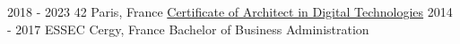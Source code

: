 \documentclass[10pt]{developercv} %
\begin{document}


\begin{entrylist}
	\entry
		{2018 - 2023}
		{42}
		{Paris, France}
		{\href{https://cv.42.fr/abarthel}{Certificate of Architect in Digital Technologies}}
	\entry
		{2014 - 2017}
		{ESSEC}
		{Cergy, France}
		{Bachelor of Business Administration}
\end{entrylist}


%
%
%
%
%

\end{document}

